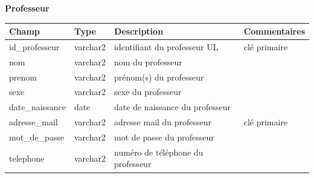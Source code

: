 \documentclass{scrreprt}
\begin{document}
\begin{center}
\vspace {3cm}
\textbf 
{Professeur}
\vspace {0,5cm}

\begin{tabular}{|p{}|p{2cm}|p{7cm}|p{}|}
  \hline
  \textbf {Champ} & \textbf {Type} & \textbf {Description} & \textbf {Commentaires} \\
  \hline
  id_professeur & varchar2 & identifiant du professeur UL & clé primaire\\
  \hline
  nom & varchar2 & nom du professeur & \\
  \hline
  prenom & varchar2 & prénom(s) du professeur &  \\
  \hline
  sexe & varchar2 & sexe du professeur &  \\
  \hline
  date_naissance & date & date de naissance du professeur &  \\
  \hline
  adresse_mail & varchar2 & adresse mail du professeur & clé primaire  \\
  \hline
  mot_de_passe & varchar2 & mot de passe du professeur &  \\
  \hline
  telephone & varchar2 & numéro de téléphone du professeur &  \\
  \hline
\end{tabular}

\end{center}
\end{document}
